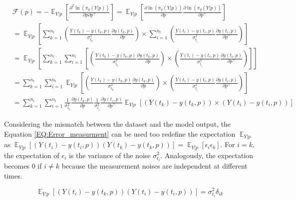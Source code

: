 \documentclass[../Article_Design_of_Experiment.tex]{subfiles}
\begin{document}
	{\scriptsize
	\begin{equation}
		\begin{aligned}
		&\mathcal{F}(p) = - \mathop{\mathbb{E}}_{Y|p} \left[ \frac{\partial^2 \ln (\pi_y (Y|p))}{\partial p \partial p^\top} \right] = \mathop{\mathbb{E}}_{Y|p} \left[ \frac{\partial \ln (\pi_y (Y|p))}{\partial p} \frac{\partial \ln (\pi_y (Y|p))}{\partial p^\top} \right] \nonumber \\
		&= \mathop{\mathbb{E}}_{Y|p} \left[ \sum_{k=1}^{n_t} \left( \frac{Y(t_k) - y(t_k, p)}{\sigma_{t_k}^2} \frac{\partial y(t_k, p)}{\partial p} \right) \times  \sum_{i=1}^{n_t} \left( \frac{Y(t_i) - y(t_i, p)}{\sigma_{t_i}^2} \frac{\partial y(t_i, p)}{\partial p^\top} \right) \right] \nonumber \\
		&= \mathop{\mathbb{E}}_{Y|p} \left[ \sum_{k=1}^{n_t} \sum_{i=1}^{n_t} \left[ \left( \frac{Y(t_k) - y(t_k, p)}{\sigma_{t_k}^2} \frac{\partial y(t_k, p)}{\partial p} \right) \times \left( \frac{Y(t_i) - y(t_i, p)}{\sigma_{t_i}^2} \frac{\partial y(t_i, p)}{\partial p^\top} \right) \right] \right] \nonumber \\
		&= \sum_{k=1}^{n_t} \sum_{i=1}^{n_t} \mathop{\mathbb{E}}_{Y|p} \left[ \left( \frac{Y(t_k) - y(t_k, p)}{\sigma_{t_k}^2} \frac{\partial y(t_k, p)}{\partial p} \right) \times \left( \frac{Y(t_i) - y(t_i, p)}{\sigma_{t_i}^2} \frac{\partial y(t_i, p)}{\partial p^\top} \right) \right] \nonumber \\
		&= \sum_{k=1}^{n_t} \sum_{i=1}^{n_t} \frac{1}{\sigma_{t_k}^2} \frac{\partial y(t_k, p)}{\partial p} \frac{1}{\sigma_{t_i}^2} \frac{\partial y(t_i, p)}{\partial p^\top} \mathop{\mathbb{E}}_{Y|p} \left[ \left( Y(t_k) - y(t_k, p) \right) \times \left( Y(t_i) - y(t_i, p) \right) \right] 
	\end{aligned} 
	\end{equation} }
	
	Considering the mismatch between the dataset and the model output, the Equation \ref{EQ:Error_measurment} can be used too redefine the expectation $\mathop{\mathbb{E}}_{Y|p}$ as $\mathop{\mathbb{E}}_{Y|p} \left[ \left( Y(t_i) - y(t_i, p) \right) \left( Y(t_k) - y(t_k, p) \right) \right] = \mathop{\mathbb{E}}_{Y|p} \left[ \epsilon_i \epsilon_k \right]$. For $i=k$, the expectation of $\epsilon_i$ is the variance of the noise $\sigma_{t_i}^2$. Analogously, the expectation becomes 0 if $i \neq k$ because the measurement noises are independent at different times.
	
	{\footnotesize
	\begin{equation}
		\mathop{\mathbb{E}}_{Y|p} \left[ \left( Y(t_i) - y(t_k, p) \right) \left( Y(t_i) - y(t_i, p) \right) \right] = \sigma_{t_i}^2 \delta_{ik}
	\end{equation} }
	
\end{document}
